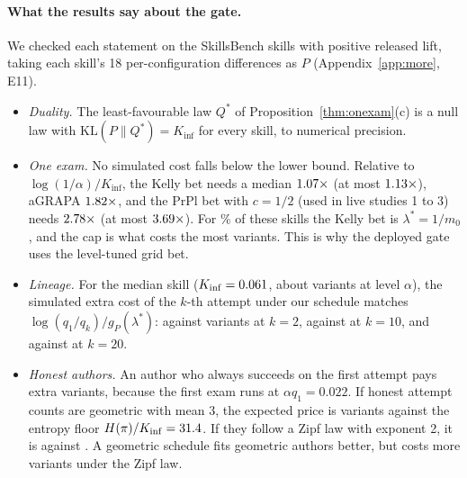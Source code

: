 \paragraph{What the results say about the gate.} We checked each statement on the \NThHelpful{} SkillsBench skills with positive released lift, taking each skill's 18 per-configuration differences as $P$ (Appendix~\ref{app:more}, E11).
\begin{itemize}
\item \emph{Duality.} The least-favourable law $Q^*$ of Proposition~\ref{thm:onexam}(c) is a null law with $\mathrm{KL}(P\|Q^*)=K_{\inf}$ for every skill, to numerical precision.
\item \emph{One exam.} No simulated cost falls below the lower bound. Relative to $\log(1/\alpha)/K_{\inf}$, the Kelly bet needs a median $1.07\times$ (at most $1.13\times$), aGRAPA $1.82\times$, and the PrPl bet with $c=1/2$ (used in live studies 1 to 3) needs $2.78\times$ (at most $3.69\times$). For \NThAllIn\% of these skills the Kelly bet is $\lambda^*=1/m_0$, and the cap is what costs the most variants. This is why the deployed gate uses the level-tuned grid bet.
\item \emph{Lineage.} For the median skill ($K_{\inf}=0.061$, about \NThMedIdeal{} variants at level $\alpha$), the simulated extra cost of the $k$-th attempt under our schedule matches $\log(q_1/q_k)/g_P(\lambda^*)$: \NThExtraTwoSim{} against \NThExtraTwoTh{} variants at $k=2$, \NThExtraTenSim{} against \NThExtraTenTh{} at $k=10$, and \NThExtraTwentySim{} against \NThExtraTwentyTh{} at $k=20$.
\item \emph{Honest authors.} An author who always succeeds on the first attempt pays \NThPriceOne{} extra variants, because the first exam runs at $\alpha q_1=0.022$. If honest attempt counts are geometric with mean 3, the expected price is \NThPriceGeoThree{} variants against the entropy floor $H(\pi)/K_{\inf}=31.4$. If they follow a Zipf law with exponent 2, it is \NThPriceZipf{} against \NThFloorZipf{}. A geometric schedule fits geometric authors better, but costs \NThGeoOnZipfLoss{} more variants under the Zipf law.
\end{itemize}
